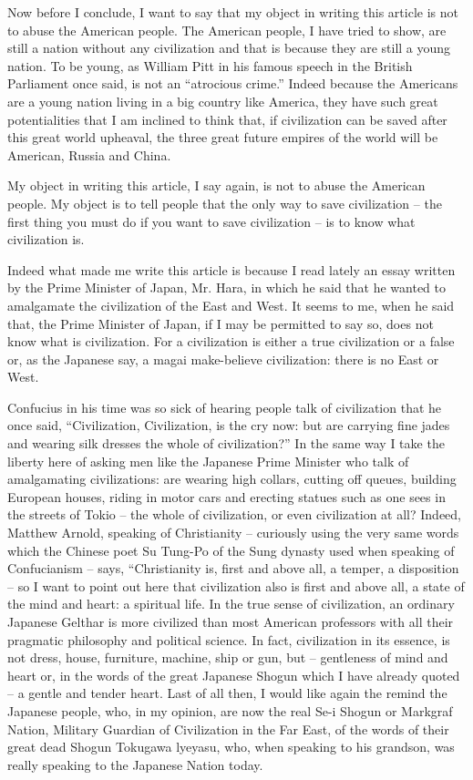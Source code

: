 Now before I conclude, I want to say that my object in writing this article is not to abuse the American people.
The American people, I have tried to show, are still a nation without any civilization and that is because they are still a young nation.
To be young, as William Pitt in his famous speech in the British Parliament once said, is not an ``atrocious crime.'' Indeed because the Americans are a young nation living in a big country like America,
they have such great potentialities that I am inclined to think that,
if civilization can be saved after this great world upheaval,
the three great future empires of the world will be American, Russia and China. 

My object in writing this article, I say again, is not to abuse the American people.
My object is to tell people that the only way to save civilization
-- the first thing you must do if you want to save civilization
-- is to know what civilization is.

Indeed what made me write this article is because I read lately an essay written by the Prime Minister of Japan,
Mr. Hara, in which he said that he wanted to amalgamate the civilization of the East and West.
It seems to me, when he said that, the Prime Minister of Japan,
if I may be permitted to say so, does not know what is civilization.
For a civilization is either a true civilization or a false or,
as the Japanese say, a magai make-believe civilization:
there is no East or West. 

Confucius in his time was so sick of hearing people talk of civilization that he once said,
``Civilization, Civilization, is the cry now:
but are carrying fine jades and wearing silk dresses the whole of civilization?''
In the same way I take the liberty here of asking men like the Japanese Prime Minister who talk of amalgamating civilizations:
are wearing high collars, cutting off queues, building European houses,
riding in motor cars and erecting statues such as one sees in the streets of Tokio
-- the whole of civilization, or even civilization at all? Indeed, Matthew Arnold, speaking of Christianity
-- curiously using the very same words which the Chinese poet Su Tung-Po of the Sung dynasty used when speaking of Confucianism -- says,
``Christianity is, first and above all, a temper, a disposition
-- so I want to point out here that civilization also is first and above all, a state of the mind and heart:
a spiritual life. In the true sense of civilization, an ordinary Japanese Gelthar is more civilized than most American professors with all their pragmatic philosophy and political science.
In fact, civilization in its essence, is not dress, house, furniture, machine, ship or gun, but
-- gentleness of mind and heart or, in the words of the great Japanese Shogun which I have already quoted -- a gentle and tender heart.
Last of all then, I would like again the remind the Japanese people, who, in my opinion,
are now the real Se-i Shogun or Markgraf Nation, Military Guardian of Civilization in the Far East,
of the words of their great dead Shogun Tokugawa lyeyasu, who, when speaking to his grandson, was really speaking to the Japanese Nation today. 

